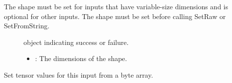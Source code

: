 \documentclass[letterpaper,10pt,english]{sphinxmanual}
\begin{document}
\begin{fulllineitems}
\begin{fulllineitems}
\begin{fulllineitems}
The shape must be set for inputs that have variable-size dimensions and is optional for other inputs. The shape must be set before calling SetRaw or SetFromString. \begin{description}
\item[{}] \leavevmode
{\hyperref[\detokenize{cpp_api/classnvidia_1_1inferenceserver_1_1client_1_1Error:classnvidia_1_1inferenceserver_1_1client_1_1Error}]{}} object indicating success or failure. 

\item[{}] \leavevmode\begin{itemize}
\item {} 
: The dimensions of the shape. 

\end{itemize}

\end{description}


\end{fulllineitems}


\begin{fulllineitems}
\label{\detokenize{cpp_api/classnvidia_1_1inferenceserver_1_1client_1_1InferContext:_CPPv4N6nvidia15inferenceserver6client12InferContext5Input6SetRawEPK7uint8_t6size_t}}%
\pysigstartmultiline
{}\label{\detokenize{cpp_api/classnvidia_1_1inferenceserver_1_1client_1_1InferContext:classnvidia_1_1inferenceserver_1_1client_1_1InferContext_1_1Input_1a414fe9afbb60a48f162bac5439beee4d}}%
\pysigstopmultiline
Set tensor values for this input from a byte array. 


\end{fulllineitems}
\end{fulllineitems}
\end{fulllineitems}
\end{document}
